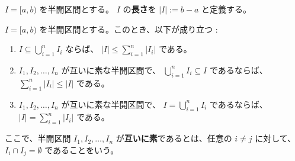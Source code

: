 \documentclass[article,paper=a4paper]{jlreq}
\begin{document}
\begin{dfn}
    $I = [a,b)$ を半開区間とする。 $I$ の\textbf{長さ}を $|I| := b - a$ と定義する。
\end{dfn}

\begin{prop}\label{prop:prop-2}
    $I = [a,b)$ を半開区間とする。このとき、以下が成り立つ :
    \begin{enumerate}[label=(\roman*)\,,ref=(\roman*)]
        \item \label{itm:prop-2-i} $I \subseteq \bigcup_{i=1}^{n} I_i$ ならば、 $|I| \leq \sum_{i=1}^{n} |I_i|$ である。
        \item \label{itm:prop-2-ii} $I_1, I_2, \ldots, I_n$ が互いに素な半開区間で、 $\bigcup_{i=1}^{n} I_i \subseteq I$ であるならば、 $\sum_{i=1}^{n} |I_i| \leq |I|$ である。
        \item \label{itm:prop-2-iii} $I_1, I_2, \ldots, I_n$ が互いに素な半開区間で、 $I = \bigcup_{i=1}^{n} I_i$ であるならば、 $|I| = \sum_{i=1}^{n} |I_i|$ である。
    \end{enumerate}
    ここで、半開区間 $I_1, I_2, \ldots, I_n$ が\textbf{互いに素}であるとは、任意の $i \neq j$ に対して、 $I_i \cap I_j = \emptyset$ であることをいう。
\end{prop}
\end{document}
